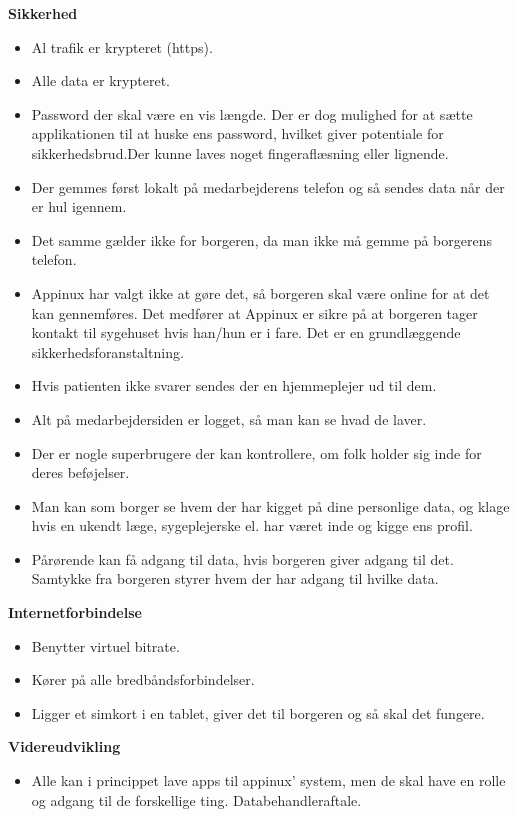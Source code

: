 \textbf{Sikkerhed}
\begin{itemize}
	\item Al trafik er krypteret (https).
	\item Alle data er krypteret.
	\item Password der skal være en vis længde. Der er dog mulighed for at sætte applikationen til at huske ens password, hvilket giver potentiale for sikkerhedsbrud.Der kunne laves noget fingeraflæsning eller lignende. 
	\item Der gemmes først lokalt på medarbejderens telefon og så sendes data når der er hul igennem.
	\item Det samme gælder ikke for borgeren, da man ikke må gemme på borgerens telefon.
	\item Appinux har valgt ikke at gøre det, så borgeren skal være online for at det kan gennemføres. Det medfører at Appinux er sikre på at borgeren tager kontakt til sygehuset hvis han/hun er i fare. Det er en grundlæggende sikkerhedsforanstaltning.
	\item Hvis patienten ikke svarer sendes der en hjemmeplejer ud til dem.
	\item Alt på medarbejdersiden er logget, så man kan se hvad de laver.
	\item Der er nogle superbrugere der kan kontrollere, om folk holder sig inde for deres beføjelser. 
	\item Man kan som borger se hvem der har kigget på dine personlige data, og klage hvis en ukendt læge, sygeplejerske el. har været inde og kigge ens profil.
	\item Pårørende kan få adgang til data, hvis borgeren giver adgang til det. Samtykke fra borgeren styrer hvem der har adgang til hvilke data.
\end{itemize}


\textbf{Internetforbindelse}
\begin{itemize}
	\item Benytter virtuel bitrate.
	\item Kører på alle bredbåndsforbindelser.
	\item Ligger et simkort i en tablet, giver det til borgeren og så skal det fungere.
\end{itemize}

\textbf{Videreudvikling}
\begin{itemize}
	\item Alle kan i princippet lave apps til appinux' system, men de skal have en rolle og adgang til de forskellige ting. Databehandleraftale.
\end{itemize}


